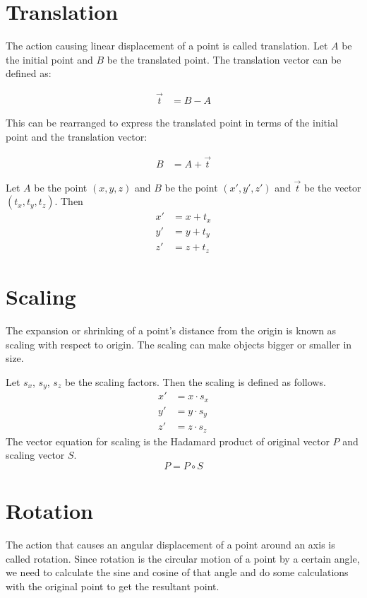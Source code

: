 \section{Translation}
The action causing linear displacement of a point is called translation. Let $A$ be the initial point and $B$ be the translated point. The translation vector can be defined as:

\begin{align*}
\vec{t} &= B - A
\end{align*}

This can be rearranged to express the translated point in terms of the initial point and the translation vector:

\begin{align*}
B &= A + \vec{t}
\end{align*}

Let  $A$ be the point \( (x, y, z) \) and $B$ be the point \( (x', y', z') \) and $\vec{t}$ be the vector \( (t_x, t_y, t_z) \). Then
\begin{equation}
\begin{aligned}
x' &= x + t_x \\
y' &= y + t_y \\
z' &= z + t_z
\end{aligned}
\end{equation}

\section{Scaling}
The expansion or shrinking of a point's distance from the origin is known as scaling with respect to origin. The scaling can make objects bigger or smaller in size. 

Let $s_x$, $s_y$, $s_z$ be the scaling factors. Then the scaling is defined as follows.
\[
\begin{aligned}
x' &= x \cdot s_x \\
y' &= y \cdot s_y \\
z' &= z \cdot s_z
\end{aligned}
\]
The vector equation for scaling is the Hadamard product of original vector $P$ and scaling vector $S$.
\[
P = P \circ  S
\]

\section{Rotation}
The action that causes an angular displacement of a point around an axis is called rotation. Since rotation is the circular motion of a point by a certain angle, we need to calculate the sine and cosine of that angle and do some calculations with the original point to get the resultant point. 

